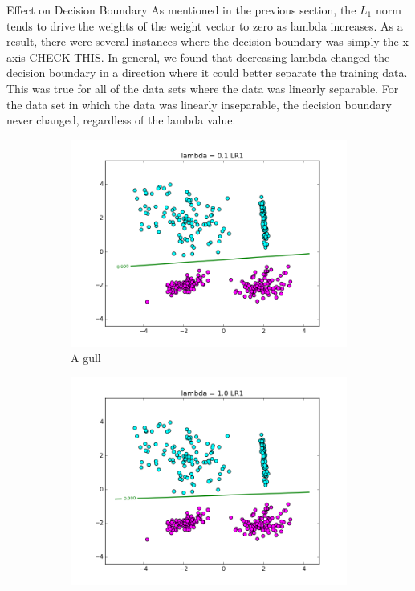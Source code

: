 \documentclass[10pt,twoside]{article}
\begin{document}
Effect on Decision Boundary 
As mentioned in the previous section, the $L_1$ norm tends to drive the weights of the weight vector to zero as lambda increases. As a result, there were several instances where the decision boundary was simply the x axis CHECK THIS. In general, we found that decreasing lambda changed the decision boundary in a direction where it could better separate the training data. This was true for all of the data sets where the data was linearly separable. For the data set in which the data was linearly inseparable, the decision boundary never changed, regardless of the lambda value. 

\begin{figure}[h]
        \begin{subfigure}[b]{0.25\textwidth}
                \centering
                \includegraphics[width=\linewidth]{Figures/P1/LR1__1.png}
                \caption{A gull}
                \label{fig:gull}
        \end{subfigure}%
        \begin{subfigure}[b]{0.25\textwidth}
                \centering
                \includegraphics[width=\linewidth]{Figures/P1/LR1_1.png}

\end{subfigure}
\end{figure}
\end{document}
